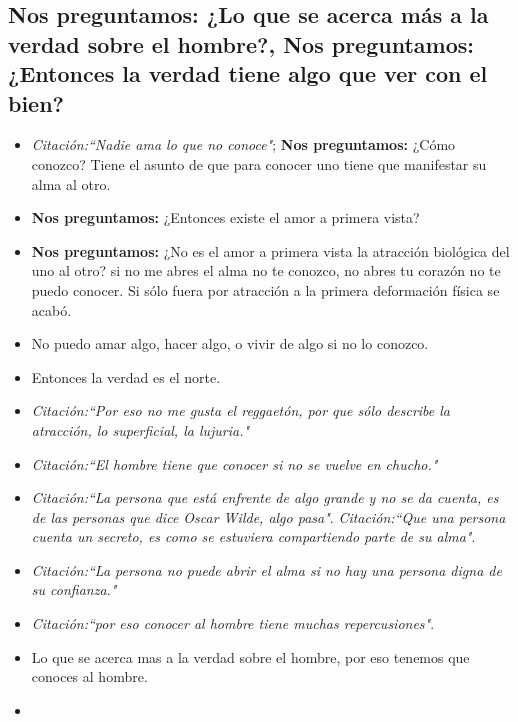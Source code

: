 \subsection{\textbf{Nos preguntamos:} ¿Lo que se acerca más a la verdad sobre el hombre?, \textbf{Nos preguntamos:} ¿Entonces la verdad tiene algo que ver con el bien?}
\begin{itemize}
    \item \emph{Citación:``Nadie ama lo que no conoce"}; \textbf{Nos preguntamos:} ¿Cómo conozco? Tiene el asunto de que para conocer uno tiene que manifestar su alma al otro.
    \item \textbf{Nos preguntamos:} ¿Entonces existe el amor a primera vista? 
    \item \textbf{Nos preguntamos:} ¿No es el amor a primera vista la atracción biológica del uno al otro? si no me abres el alma no te conozco, no abres tu corazón no te puedo conocer. Si sólo fuera por atracción a la primera deformación física se acabó.
    \item No puedo amar algo, hacer algo, o vivir de algo si no lo conozco.
    \item Entonces la verdad es el norte.
    \item \emph{Citación:``Por eso no me gusta el reggaetón, por que sólo describe la atracción, lo superficial, la lujuria."}
    \item \emph{Citación:``El hombre tiene que conocer si no se vuelve en chucho."}
    \item \emph{Citación:``La persona que está enfrente de algo grande y no se da cuenta, es de las personas que dice Oscar Wilde, algo pasa"}. \emph{Citación:``Que una persona cuenta un secreto, es como se estuviera compartiendo parte de su alma"}. 
    \item \emph{Citación:``La persona no puede abrir el alma si no hay una persona digna de su confianza."}
    \item \emph{Citación:``por eso conocer al hombre tiene muchas repercusiones"}.
    \item Lo que se acerca mas a la verdad sobre el hombre, por eso tenemos que conoces al hombre.
    \item 
\end{itemize}
